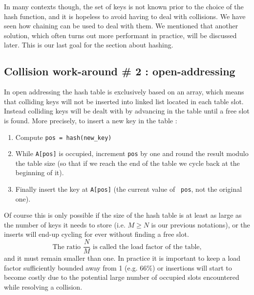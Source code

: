 \documentclass[12pt]{article}
\theoremstyle{plain}
\theoremstyle{remark}
\begin{document}
\medskip

In many contexts though, the set of keys is not known prior to the choice of the
hash function, and it is hopeless to avoid having to deal with collisions. We
have seen how chaining can be used to deal with them. We mentioned that another
solution, which often turns out more performant in practice, will be discussed
later. This is our last goal for the section about hashing.

\subsection{Collision work-around \# 2 : open-addressing} 

In open addressing the hash table is exclusively based on an array, which means that
colliding keys will not be inserted into linked list located in each table
slot. Instead colliding keys will be dealt with by advancing in the table until
a free slot is found. More precisely, to insert a new key in the table :
\begin{enumerate}
	\item Compute {\tt pos = hash(new\_key)}
	\item While {\tt A[pos]} is occupied, increment {\tt pos} by one and round
		the result modulo the table size (so that if we reach the end of
		the table we cycle back at the beginning of it).
	\item Finally insert the key at {\tt A[pos]} (the current value of {\tt
		pos}, not the original one).
\end{enumerate}

Of course this is only possible if the size of the hash table is at least as
large as the number of keys it needs to store (i.e. $M \geq N$ is our previous
notations), or the inserts will end-up cycling for ever without finding a free
slot.
$$
\text{The ratio } \frac{N}{M} \text{ is called the load factor of the table,}
$$
and it must remain smaller than one. In practice it is important to keep
a load factor sufficiently bounded away from 1 (e.g. $66\%$) or insertions
will start to become costly due to the potential large number of occupied slots 
encountered while resolving a collision.

\medskip
\end{document}
